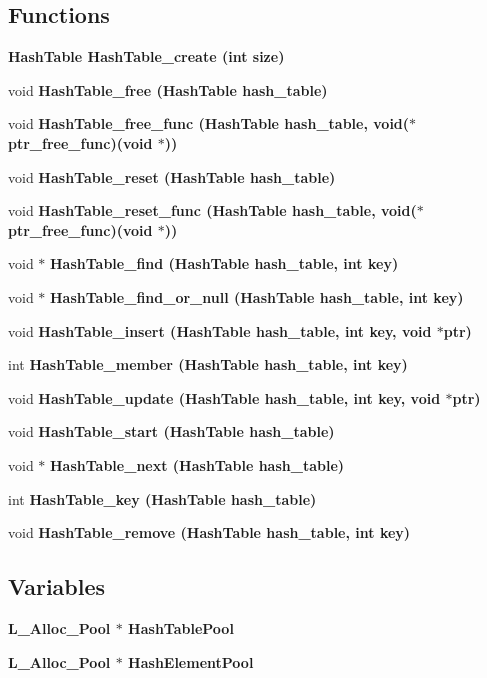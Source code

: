 \subsection*{Functions}
\begin{CompactItemize}
\item 
\bf{Hash\-Table} \bf{Hash\-Table\_\-create} (int size)
\item 
void \bf{Hash\-Table\_\-free} (\bf{Hash\-Table} hash\_\-table)
\item 
void \bf{Hash\-Table\_\-free\_\-func} (\bf{Hash\-Table} hash\_\-table, void($\ast$ptr\_\-free\_\-func)(void $\ast$))
\item 
void \bf{Hash\-Table\_\-reset} (\bf{Hash\-Table} hash\_\-table)
\item 
void \bf{Hash\-Table\_\-reset\_\-func} (\bf{Hash\-Table} hash\_\-table, void($\ast$ptr\_\-free\_\-func)(void $\ast$))
\item 
void $\ast$ \bf{Hash\-Table\_\-find} (\bf{Hash\-Table} hash\_\-table, int key)
\item 
void $\ast$ \bf{Hash\-Table\_\-find\_\-or\_\-null} (\bf{Hash\-Table} hash\_\-table, int key)
\item 
void \bf{Hash\-Table\_\-insert} (\bf{Hash\-Table} hash\_\-table, int key, void $\ast$ptr)
\item 
int \bf{Hash\-Table\_\-member} (\bf{Hash\-Table} hash\_\-table, int key)
\item 
void \bf{Hash\-Table\_\-update} (\bf{Hash\-Table} hash\_\-table, int key, void $\ast$ptr)
\item 
void \bf{Hash\-Table\_\-start} (\bf{Hash\-Table} hash\_\-table)
\item 
void $\ast$ \bf{Hash\-Table\_\-next} (\bf{Hash\-Table} hash\_\-table)
\item 
int \bf{Hash\-Table\_\-key} (\bf{Hash\-Table} hash\_\-table)
\item 
void \bf{Hash\-Table\_\-remove} (\bf{Hash\-Table} hash\_\-table, int key)
\end{CompactItemize}
\subsection*{Variables}
\begin{CompactItemize}
\item 
\bf{L\_\-Alloc\_\-Pool} $\ast$ \bf{Hash\-Table\-Pool}
\item 
\bf{L\_\-Alloc\_\-Pool} $\ast$ \bf{Hash\-Element\-Pool}
\end{CompactItemize}


